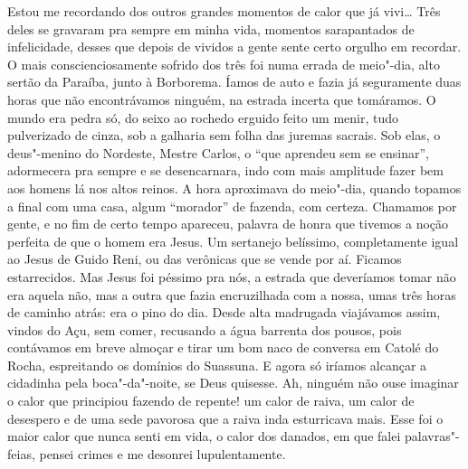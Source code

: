Estou me recordando dos outros grandes momentos de calor que já vivi\ldots{}
Três deles se gravaram pra sempre em minha vida, momentos sarapantados
de infelicidade, desses que depois de vividos a gente sente certo
orgulho em recordar. O mais conscienciosamente sofrido dos três foi numa
errada de meio"-dia, alto sertão da Paraíba, junto à Borborema. Íamos
de auto e fazia já seguramente duas horas que não encontrávamos ninguém,
na estrada incerta que tomáramos. O mundo era pedra só, do seixo ao
rochedo erguido feito um menir, tudo pulverizado de cinza, sob a
galharia sem folha das juremas sacrais. Sob elas, o deus"-menino do
Nordeste, Mestre Carlos, o ``que aprendeu sem se ensinar'', adormecera pra
sempre e se desencarnara, indo com mais amplitude fazer bem aos homens
lá nos altos reinos. A hora aproximava do meio"-dia, quando topamos a
final com uma casa, algum ``morador'' de fazenda, com certeza. Chamamos
por gente, e no fim de certo tempo apareceu, palavra de honra que
tivemos a noção perfeita de que o homem era Jesus. Um sertanejo
belíssimo, completamente igual ao Jesus de Guido Reni, ou das verônicas
que se vende por aí. Ficamos estarrecidos. Mas Jesus foi péssimo pra
nós, a estrada que deveríamos tomar não era aquela não, mas a outra que
fazia encruzilhada com a nossa, umas três horas de caminho atrás: era o
pino do dia. Desde alta madrugada viajávamos assim, vindos do Açu, sem
comer, recusando a água barrenta dos pousos, pois contávamos em breve
almoçar e tirar um bom naco de conversa em Catolé do Rocha, espreitando
os domínios do Suassuna. E agora só iríamos alcançar a cidadinha pela
boca"-da"-noite, se Deus quisesse. Ah, ninguém não ouse imaginar o calor
que principiou fazendo de repente! um calor de raiva, um calor de
desespero e de uma sede pavorosa que a raiva inda esturricava mais. Esse
foi o maior calor que nunca senti em vida, o calor dos danados, em que
falei palavras"-feias, pensei crimes e me desonrei lupulentamente.

